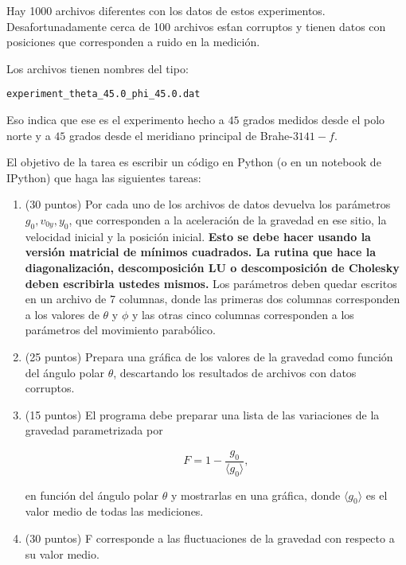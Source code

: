 \documentclass{article}
\begin{document}
Hay 1000 archivos
diferentes con los datos de estos experimentos. Desafortunadamente
cerca de 100 archivos es\'tan corruptos y tienen datos con posiciones
que corresponden a ruido en la medici\'on.

Los archivos tienen nombres del tipo:
\begin{center}
\verb"experiment_theta_45.0_phi_45.0.dat"\\
\end{center}

Eso indica que ese es el experimento hecho a
$45$ grados medidos desde el polo norte y a $45$ grados desde el
meridiano principal de Brahe-$3141-f$.


El objetivo de la tarea es escribir un c\'odigo en Python (o en un
notebook de IPython) que haga las siguientes tareas:
\begin{enumerate}

\item (30 puntos)
Por cada uno de los archivos de datos devuelva los par\'ametros
$g_0,v_{0y}, y_{0}$, que corresponden a la aceleraci\'on de la gravedad
en ese sitio, la velocidad inicial y la posici\'on inicial. {\bf Esto se debe
hacer usando la versi\'on matricial de m\'inimos cuadrados. La rutina
que hace la diagonalizaci\'on, descomposici\'on LU o descomposici\'on de Cholesky deben escribirla
ustedes mismos.} Los par\'ametros deben quedar escritos en un archivo
de 7 columnas, donde las primeras dos columnas corresponden a los
valores de $\theta$ y $\phi$ y las otras cinco columnas corresponden a
los par\'ametros del movimiento parab\'olico. 


\item (25 puntos)
Prepara una gr\'afica de los valores de la gravedad como funci\'on del
\'angulo polar $\theta$, descartando los resultados de archivos con
datos corruptos.

\item (15 puntos)
El programa debe preparar una lista de las variaciones de la gravedad
parametrizada por 

\begin{displaymath}
F=1-\frac{g_{0}}{\langle g_{0}\rangle},
\end{displaymath}

en funci\'on del \'angulo polar $\theta$ y mostrarlas en una
gr\'afica, donde $\langle g_{0} \rangle$ es el valor medio de todas las mediciones. 

\item (30 puntos)
F corresponde a las fluctuaciones de la gravedad con respecto a su
valor medio.


\end{enumerate}
\end{document}
